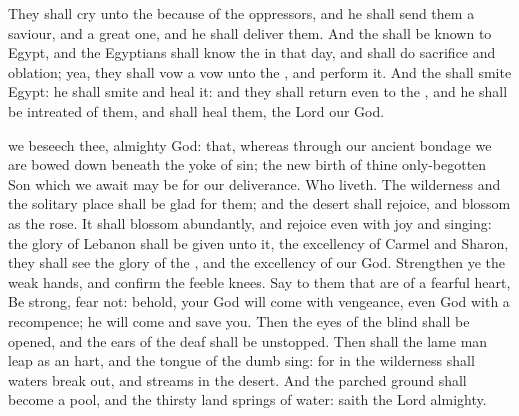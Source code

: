  They shall cry unto the  because of the oppressors, and he shall send them a saviour, and a great one, and he shall deliver them. And the  shall be known to Egypt, and the Egyptians shall know the  in that day, and shall do sacrifice and oblation; yea, they shall vow a vow unto the , and perform it. And the  shall smite Egypt: he shall smite and heal it: and they shall return even to the , and he shall be intreated of them, and shall heal them,
the Lord our God.

\collect
{} we beseech thee, almighty God: that, whereas through our ancient bondage we are bowed down beneath the yoke of sin; the new birth of thine only-begotten Son which we await may be for our deliverance. Who liveth.
 The wilderness and the solitary place shall be glad for them; and the desert shall rejoice, and blossom as the rose. It shall blossom abundantly, and rejoice even with joy and singing: the glory of Lebanon shall be given unto it, the excellency of Carmel and Sharon, they shall see the glory of the , and the excellency of our God. Strengthen ye the weak hands, and confirm the feeble knees. Say to them that are of a fearful heart, Be strong, fear not: behold, your God will come with vengeance, even God with a recompence; he will come and save you. Then the eyes of the blind shall be opened, and the ears of the deaf shall be unstopped. Then shall the lame man leap as an hart, and the tongue of the dumb sing: for in the wilderness shall waters break out, and streams in the desert. And the parched ground shall become a pool, and the thirsty land springs of water: %
saith the Lord almighty.

